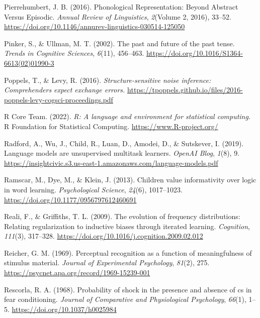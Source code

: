 \documentclass[
  12pt,
  letterpaper,
]{scrreport}
\newlength{\cslhangindent}
\newenvironment{CSLReferences}[2] %
 {\begin{list}{}{%
  \setlength{\itemindent}{0pt}
  \setlength{\leftmargin}{0pt}
  \setlength{\parsep}{0pt}
  \ifodd #1
   \setlength{\leftmargin}{\cslhangindent}
   \setlength{\itemindent}{-1\cslhangindent}
  \fi
  \setlength{\itemsep}{#2\baselineskip}}}
 {\end{list}}
\begin{document}
\begin{CSLReferences}{1}{0}
Pierrehumbert, J. B. (2016). Phonological Representation: Beyond
Abstract Versus Episodic. \emph{Annual Review of Linguistics},
\emph{2}(Volume 2, 2016), 33--52.
\url{https://doi.org/10.1146/annurev-linguistics-030514-125050}

Pinker, S., \& Ullman, M. T. (2002). The past and future of the past
tense. \emph{Trends in Cognitive Sciences}, \emph{6}(11), 456--463.
\url{https://doi.org/10.1016/S1364-6613(02)01990-3}

Poppels, T., \& Levy, R. (2016). \emph{Structure-sensitive noise
inference: Comprehenders expect exchange errors.}
\url{https://tpoppels.github.io/files/2016-poppels-levy-cogsci-proceedings.pdf}

R Core Team. (2022). \emph{R: A language and environment for statistical
computing}. R Foundation for Statistical Computing.
\url{https://www.R-project.org/}

Radford, A., Wu, J., Child, R., Luan, D., Amodei, D., \& Sutskever, I.
(2019). Language models are unsupervised multitask learners.
\emph{OpenAI Blog}, \emph{1}(8), 9.
\url{https://insightcivic.s3.us-east-1.amazonaws.com/language-models.pdf}

Ramscar, M., Dye, M., \& Klein, J. (2013). Children value informativity
over logic in word learning. \emph{Psychological Science}, \emph{24}(6),
1017--1023. \url{https://doi.org/10.1177/0956797612460691}

Reali, F., \& Griffiths, T. L. (2009). The evolution of frequency
distributions: Relating regularization to inductive biases through
iterated learning. \emph{Cognition}, \emph{111}(3), 317--328.
\url{https://doi.org/10.1016/j.cognition.2009.02.012}

Reicher, G. M. (1969). Perceptual recognition as a function of
meaningfulness of stimulus material. \emph{Journal of Experimental
Psychology}, \emph{81}(2), 275.
\url{https://psycnet.apa.org/record/1969-15239-001}

Rescorla, R. A. (1968). Probability of shock in the presence and absence
of cs in fear conditioning. \emph{Journal of Comparative and
Physiological Psychology}, \emph{66}(1), 1--5.
\url{https://doi.org/10.1037/h0025984}


\end{CSLReferences}
\end{document}
